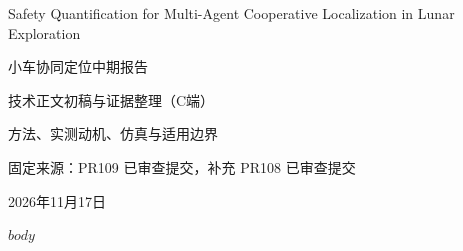 \documentclass[12pt,a4paper]{article}
\begin{document}
\hypersetup{pageanchor=false}
\begin{titlepage}
\centering
\vspace*{28mm}
{\LARGE Safety Quantification for Multi-Agent Cooperative Localization in Lunar Exploration\par}
\vspace{16mm}
{\Huge 小车协同定位中期报告\par}
\vspace{10mm}
{\Large 技术正文初稿与证据整理（C端）\par}
\vspace{16mm}
{\large 方法、实测动机、仿真与适用边界\par}
\vfill
{\normalsize 固定来源：PR109 已审查提交，补充 PR108 已审查提交\par}
\vspace{5mm}
{\normalsize 2026年11月17日\par}
\end{titlepage}
\tableofcontents
\clearpage
\setcounter{page}{1}
\hypersetup{pageanchor=true}
$body$
\end{document}
